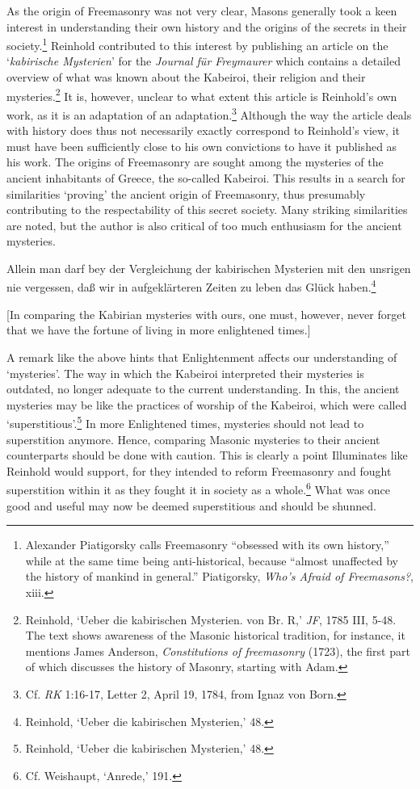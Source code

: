 As the origin of Freemasonry was not very clear, Masons generally took a keen interest in understanding their own history and the origins of the secrets in their society.\footnote{ Alexander Piatigorsky calls Freemasonry ``obsessed with its own history,'' while at the same time being anti{-}historical, because ``almost unaffected by the history of mankind in general.'' Piatigorsky, \textit{Who's Afraid of Freemasons?}, xiii. } Reinhold contributed to this interest by publishing an article on the `\textit{kabirische Mysterien}' for the \textit{Journal f\"{u}r Freymaurer} which contains a detailed overview of what was known about the Kabeiroi, their religion and their mysteries.\footnote{ Reinhold, `Ueber die kabirischen Mysterien. von Br. R\textasteriskcentered \textasteriskcentered ,' \textit{JF}, 1785 III, 5{-}48. The text shows awareness of the Masonic historical tradition, for instance, it mentions James Anderson, \textit{Constitutions of freemasonry} (1723), the first part of which discusses the history of Masonry, starting with Adam.} It is, however, unclear to what extent this article is Reinhold's own work, as it is an adaptation of an adaptation.\footnote{ Cf. \textit{RK} 1:16{-}17, Letter 2, April 19, 1784, from Ignaz von Born. } Although the way the article deals with history does thus not necessarily exactly correspond to Reinhold's view, it must have been sufficiently close to his own convictions to have it published as his work. The origins of Freemasonry are sought among the mysteries of the ancient inhabitants of Greece, the so{-}called Kabeiroi. This results in a search for similarities `proving' the ancient origin of Freemasonry, thus presumably contributing to the respectability of this secret society. Many striking similarities are noted, but the author is also critical of too much enthusiasm for the ancient mysteries. 

Allein man darf bey der Vergleichung der kabirischen Mysterien mit den unsrigen nie vergessen, da\ss{} wir in aufgekl\"{a}rteren Zeiten zu leben das Gl\"{u}ck haben.\footnote{ Reinhold, `Ueber die kabirischen Mysterien,' 48.}

[In comparing the Kabirian mysteries with ours, one must, however, never forget that we have the fortune of living in more enlightened times.]

A remark like the above hints that Enlightenment affects our understanding of `mysteries'. The way in which the Kabeiroi interpreted their mysteries is outdated, no longer adequate to the current understanding. In this, the ancient mysteries may be like the practices of worship of the Kabeiroi, which were called `superstitious'.\footnote{ Reinhold, `Ueber die kabirischen Mysterien,' 48. } In more Enlightened times, mysteries should not lead to superstition anymore. Hence, comparing Masonic mysteries to their ancient counterparts should be done with caution. This is clearly a point Illuminates like Reinhold would support, for they intended to reform Freemasonry and fought superstition within it as they fought it in society as a whole.\footnote{ Cf. Weishaupt, `Anrede,' 191.} What was once good and useful may now be deemed superstitious and should be shunned. 

